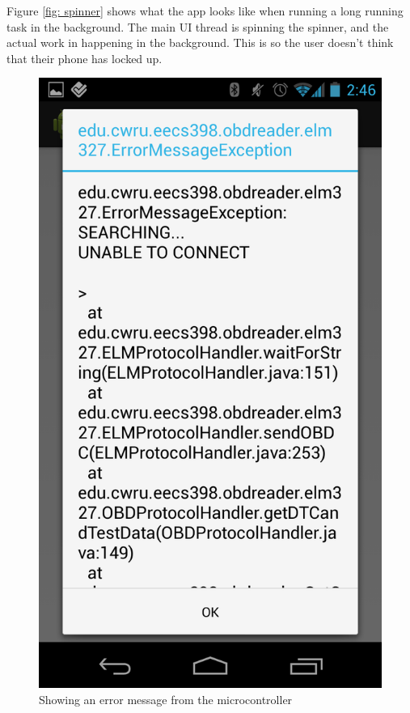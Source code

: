 \documentclass[12pt,letterpaper]{article}
\begin{document}
Figure \ref{fig: spinner} shows what the app looks like when running
a long running task in the background. The main UI thread is spinning
the spinner, and the actual work in happening in the background. This
is so the user doesn't think that their phone has locked up.

\begin{figure}[H]
\centering
\includegraphics[totalheight=15cm]{images/errormessage.png}
\caption{Showing an error message from the microcontroller}
\label{fig: error}
\end{figure} 
\end{document}
